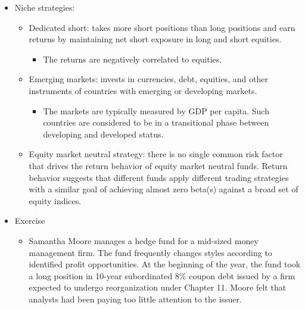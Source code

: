 \begin{itemize}
\begin{itemize}
\begin{itemize}
        \item Gamma/vega trading
        \end{itemize}
    \item Long/short equity: invests in both long and short sides of equity markets, generally focusing on diversifying or hedging across particular sectors, regions or market capitalizations.
        \begin{itemize}
        \item Managers typically have the flexibility to shift from value to growth; small to medium to large capitalization stocks; and net long to net short.
        \item 30-40\% of hedge funds are long/short.
        \end{itemize}
    \end{itemize}
\item Niche strategies:
    \begin{itemize}
    \item Dedicated short: takes more short positions than long positions and earn returns by maintaining net short exposure in long and short equities.
        \begin{itemize}
        \item The returns are negatively correlated to equities.
        \end{itemize}
    \item Emerging markets: invests in currencies, debt, equities, and other instruments of countries with emerging or developing markets.
        \begin{itemize}
        \item The markets are typically measured by GDP per capita. Such countries are considered to be in a transitional phase between developing and developed status.
        \end{itemize}
    \item Equity market neutral strategy: there is no single common risk factor that drives the return behavior of equity market neutral funds. Return behavior suggests that different funds apply different trading strategies with a similar goal of achieving almost zero beta(s) against a broad set of equity indices.
    \end{itemize}
\item Exercise
    \begin{itemize}
    \item Samantha Moore manages a hedge fund for a mid-sized money management firm. The fund frequently changes styles according to identified profit opportunities. At the beginning of the year, the fund took a long position in 10-year subordinated 8\% coupon debt issued by a firm expected to undergo reorganization under Chapter 11. Moore felt that analysts had been paying too little attention to the issuer.
    

\end{itemize}
\end{itemize}
